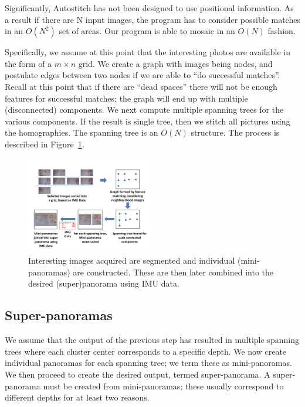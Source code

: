\documentclass[10pt,twocolumn,letterpaper]{article}
\begin{document}
Significantly, Autostitch has not been designed to use positional
information. As a result if there are N input images, the program has
to consider possible matches in an $O(N^2)$ set of areas.  Our program
is able to mosaic in an $O(N)$ fashion.
 
Specifically, we assume at this point that the interesting photos are
available in the form of a $m \times n$ grid. We create a graph with
images being nodes, and postulate edges between two nodes if we are
able to ``do successful matches''. Recall at this point that if there
are ``dead spaces'' there will not be enough features for successful
matches; the graph will end up with multiple (disconnected)
components.  We next compute multiple spanning trees for the various
components. If the result is single tree, then we stitch all pictures
using the homographies.  The spanning tree is an $O(N)$ structure. The
process is described in Figure~\ref{fig:graph}.

\begin{figure}[h!]
  \centering
  \includegraphics[width=0.49\textwidth]{figures/graph} 
  \caption{ \label{fig:graph} Interesting images acquired are
    segmented and individual (mini-panoramas) are constructed. These
    are then later combined into the desired (super)panorama using IMU data.}
\end{figure}    


\subsection{Super-panoramas}
We assume that the output of the previous step has resulted in
multiple spanning trees where each cluster center corresponds to a
specific depth. We now create individual panoramas for each spanning
tree; we term these as mini-panoramas. We then proceed to create the
desired output, termed super-panorama.  A super-panorama must be
created from mini-panoramas; these usually correspond to different
depths for at least two reasons.
\end{document}
